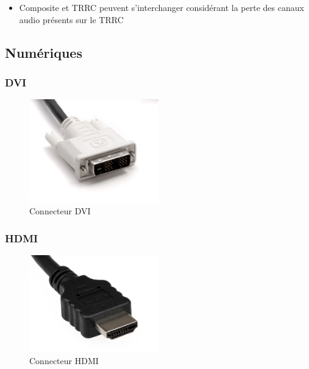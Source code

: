 \documentclass[
  french,
]{book}
\providecommand{\tightlist}{%
  \setlength{\itemsep}{0pt}\setlength{\parskip}{0pt}}
\begin{document}
\begin{itemize}
\tightlist
\item
  Composite et TRRC peuvent s'interchanger considérant la perte des canaux audio présents sur le TRRC
\end{itemize}

\hypertarget{numuxe9riques}{%
\subsection{Numériques}\label{numuxe9riques}}

\hypertarget{dvi}{%
\subsubsection{DVI}\label{dvi}}

\begin{figure}
\centering
\includegraphics[width=0.5\textwidth,height=\textheight]{medias/lexique/signaux/numerique/dvi.jpg}
\caption{Connecteur DVI}
\end{figure}

\hypertarget{hdmi}{%
\subsubsection{HDMI}\label{hdmi}}

\begin{figure}
\centering
\includegraphics[width=0.5\textwidth,height=\textheight]{medias/lexique/signaux/numerique/hdmi.jpg}
\caption{Connecteur HDMI}
\end{figure}
\end{document}
